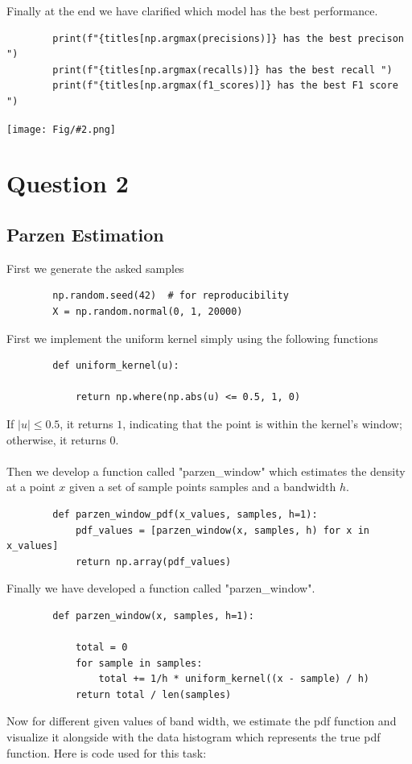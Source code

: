 \documentclass[]{article}
\newcommand{\pict}[2]{\begin{center}
		\texttt{[image: Fig/\#2.png]}
\end{center}}
\begin{document}
	Finally at the end we have clarified which model has the best performance.
	\begin{lstlisting}
		print(f"{titles[np.argmax(precisions)]} has the best precison ")
		print(f"{titles[np.argmax(recalls)]} has the best recall ")
		print(f"{titles[np.argmax(f1_scores)]} has the best F1 score ")
	\end{lstlisting}
	\pict{0.3}{F8}
	\section{Question 2}
	\subsection{Parzen Estimation}
	First we generate the asked samples
	\begin{lstlisting}
		np.random.seed(42)  # for reproducibility
		X = np.random.normal(0, 1, 20000)
	\end{lstlisting}
	First we implement the uniform kernel simply using the following functions 
	\begin{lstlisting}
		def uniform_kernel(u):
		
			return np.where(np.abs(u) <= 0.5, 1, 0)
	\end{lstlisting}
	If $|u| \le 0.5$, it returns $1$, indicating that the point is within the kernel’s window; otherwise, it returns $0$.\\\\
	Then we develop a function called "parzen\_window" which estimates the density at a point $x$ given a set of sample points samples and a bandwidth $h$.
	\begin{lstlisting}
		def parzen_window_pdf(x_values, samples, h=1):
			pdf_values = [parzen_window(x, samples, h) for x in x_values]
			return np.array(pdf_values)
	\end{lstlisting}
	Finally we have developed a function called "parzen\_window".
	\begin{lstlisting}
		def parzen_window(x, samples, h=1):
		
			total = 0
			for sample in samples:
				total += 1/h * uniform_kernel((x - sample) / h)
			return total / len(samples)
	\end{lstlisting}
	Now for different given values of band width, we estimate the pdf function and visualize it alongside with the data histogram which represents the true pdf function. Here is code used for this task:
\end{document}
